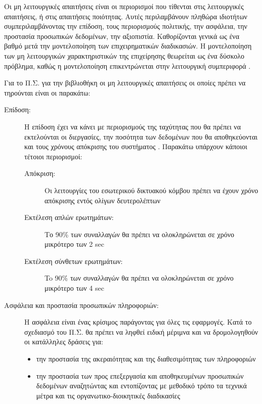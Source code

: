 \documentclass{assignment}
\begin{document}
Οι μη λειτουργικές απαιτήσεις είναι οι περιορισμοί που τίθενται στις λειτουργικές απαιτήσεις, ή στις απαιτήσεις ποιότητας. Αυτές περιλαμβάνουν πληθώρα ιδιοτήτων συμπεριλαμβάνοντας την επίδοση, τους περιορισμούς πολιτικής, την ασφάλεια, την προστασία προσωπικών δεδομένων, την αξιοπιστία. Καθορίζονται γενικά ως ένα βαθμό μετά την μοντελοποίηση των επιχειρηματικών διαδικασιών. Η μοντελοποίηση των μη λειτουργικών χαρακτηριστικών της επιχείρησης θεωρείται ως ένα δύσκολο πρόβλημα, καθώς η μοντελοποίηση επικεντρώνεται στην λειτουργική συμπεριφορά \cite{triadis}.

Για το Π.Σ. για την βιβλιοθήκη οι μη λειτουργικές απαιτήσεις οι οποίες πρέπει να τηρούνται είναι οι παρακάτω:

\begin{description}
\item[Επίδοση:] Η επίδοση έχει να κάνει με περιορισμούς της ταχύτητας που θα πρέπει να εκτελούνται οι διεργασίες, την ποσότητα των δεδομένων που θα αποθηκεύονται και τους χρόνους απόκρισης του συστήματος \cite{triadis}. Παρακάτω υπάρχουν κάποιοι τέτοιοι περιορισμοί:
\begin{description}
	\item [Απόκριση:] Οι λειτουργίες του εσωτερικού δικτυακού κόμβου πρέπει να έχουν χρόνο απόκρισης εντός ολίγων δευτερολέπτων

	\item [Εκτέλεση απλών ερωτημάτων:] Το 90\% των συναλλαγών θα πρέπει να ολοκληρώνεται σε χρόνο μικρότερο των 2 sec

	\item [Εκτέλεση σύνθετων ερωτημάτων:] To 90\% των συναλλαγών θα πρέπει να ολοκληρώνεται σε χρόνο μικρότερο των 4 sec
\end{description}

\item[Ασφάλεια και προστασία προσωπικών πληροφοριών:] Η ασφάλεια είναι ένας κρίσιμος παράγοντας για όλες τις εφαρμογές. Κατά το σχεδιασμό του Π.Σ. θα πρέπει να ληφθεί ειδική μέριμνα και να δρομολογηθούν οι κατάλληλες δράσεις για:
\begin{itemize}
	\item την προστασία της ακεραιότητας και της διαθεσιμότητας των πληροφοριών
	\item την προστασία των προς επεξεργασία και αποθηκευμένων προσωπικών δεδομένων αναζητώντας και εντοπίζοντας με μεθοδικό τρόπο τα τεχνικά μέτρα και τις οργανωτικο-διοικητικές διαδικασίες
\end{itemize}


\end{description}
\end{document}
